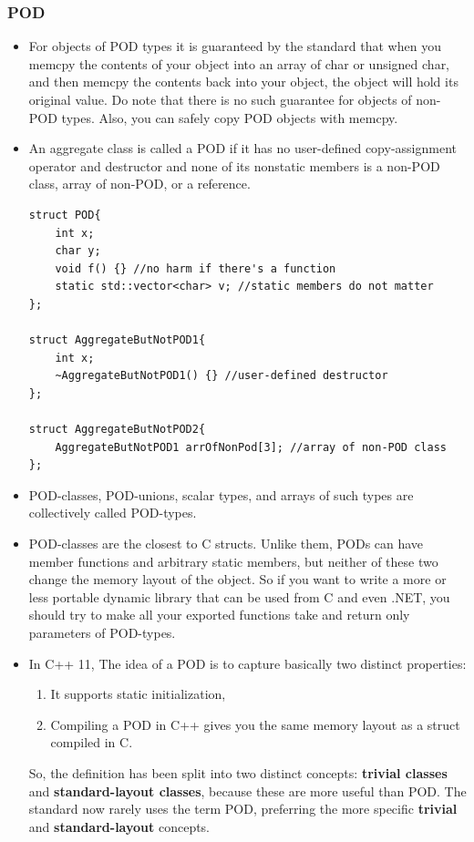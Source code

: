 \documentclass[a4paper,11pt,twoside]{book}
\begin{document}
\subsubsection{POD}
\begin{itemize}
	
	\item For objects of POD types it is guaranteed by the standard that when you memcpy the contents of your object into an array of char or unsigned char, and then memcpy the contents back into your object, the object will hold its original value. Do note that there is no such guarantee for objects of non-POD types. Also, you can safely copy POD objects with memcpy.
	
	\item An aggregate class is called a POD if it has no user-defined copy-assignment operator and destructor and none of its nonstatic members is a non-POD class, array of non-POD, or a reference.
	
\begin{lstlisting}[numbers=none]
struct POD{
	int x;
	char y;
	void f() {} //no harm if there's a function
	static std::vector<char> v; //static members do not matter
};
	
struct AggregateButNotPOD1{
	int x;
	~AggregateButNotPOD1() {} //user-defined destructor
};
	
struct AggregateButNotPOD2{
	AggregateButNotPOD1 arrOfNonPod[3]; //array of non-POD class
};
\end{lstlisting}
	
	
	\item POD-classes, POD-unions, scalar types, and arrays of such types are collectively called POD-types.
	
	\item POD-classes are the closest to C structs. Unlike them, PODs can have member functions and arbitrary static members, but neither of these two change the memory layout of the object. So if you want to write a more or less portable dynamic library that can be used from C and even .NET, you should try to make all your exported functions take and return only parameters of POD-types.
		
	
	\item In C++ 11, The idea of a POD is to capture basically two distinct properties:
	\begin{enumerate}
		\item It supports static initialization,
		\item Compiling a POD in C++ gives you the same memory layout as a struct compiled in C.
	\end{enumerate}
	
	So, the definition has been split into two distinct concepts: \textbf{trivial classes} and \textbf{standard-layout classes}, because these are more useful than POD. The standard now rarely uses the term POD, preferring the more specific \textbf{trivial} and \textbf{standard-layout} concepts.
\end{itemize}
\end{document}
